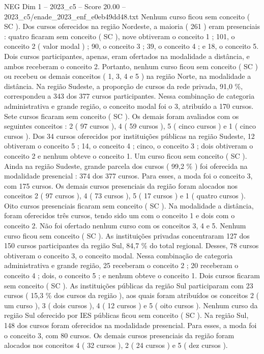 \begin{textsample}{NEG Dim 1 – 2023\_c5 – Score 20.00 – 2023\_c5/enade\_2023\_enf\_e0eb49dd48.txt}
Nenhum curso ficou sem conceito ( SC ).
Dos cursos oferecidos na região Nordeste, a maioria ( 261 ) eram presenciais : quatro ficaram sem conceito ( SC ), nove obtiveram o conceito 1 ; 101, o conceito 2 ( valor modal ) ; 90, o conceito 3 ; 39, o conceito 4 ; e 18, o conceito 5.
Dois cursos participantes, apenas, eram ofertados na modalidade a distância, e ambos receberam o conceito 2.
Portanto, nenhum curso ficou sem conceito ( SC ) ou recebeu os demais conceitos ( 1, 3, 4 e 5 ) na região Norte, na modalidade a distância.
Na região Sudeste, a proporção de cursos da rede privada, 91,0 \%, correspondeu a 343 dos 377 cursos participantes.
Nessa combinação de categoria administrativa e grande região, o conceito modal foi o 3, atribuído a 170 cursos.
Sete cursos ficaram sem conceito ( SC ).
Os demais foram avaliados com os seguintes conceitos : 2 ( 97 cursos ), 4 ( 59 cursos ), 5 ( cinco cursos ) e 1 ( cinco cursos ).
Dos 34 cursos oferecidos por instituições públicas na região Sudeste, 12 obtiveram o conceito 5 ; 14, o conceito 4 ; cinco, o conceito 3 ; dois obtiveram o conceito 2 e nenhum obteve o conceito 1.
Um curso ficou sem conceito ( SC ).
Ainda na região Sudeste, grande parcela dos cursos ( 99,2 \% ) foi oferecida na modalidade presencial : 374 dos 377 cursos.
Para esses, a moda foi o conceito 3, com 175 cursos.
Os demais cursos presenciais da região foram alocados nos conceitos 2 ( 97 cursos ), 4 ( 73 cursos ), 5 ( 17 cursos ) e 1 ( quatro cursos ).
Oito cursos presenciais ficaram sem conceito ( SC ).
Na modalidade a distância, foram oferecidos três cursos, tendo sido um com o conceito 1 e dois com o conceito 2.
Não foi ofertado nenhum curso com os conceitos 3, 4 e 5.
Nenhum curso ficou sem conceito ( SC ).
As instituições privadas concentraram 127 dos 150 cursos participantes da região Sul, 84,7 \% do total regional.
Desses, 78 cursos obtiveram o conceito 3, o conceito modal.
Nessa combinação de categoria administrativa e grande região, 25 receberam o conceito 2 ; 20 receberam o conceito 4 ; dois, o conceito 5 ; e nenhum obteve o conceito 1.
Dois cursos ficaram sem conceito ( SC ).
As instituições públicas da região Sul participaram com 23 cursos ( 15,3 \% dos cursos da região ), aos quais foram atribuídos os conceitos 2 ( um curso ), 3 ( dois cursos ), 4 ( 12 cursos ) e 5 ( oito cursos ).
Nenhum curso da região Sul oferecido por IES públicas ficou sem conceito ( SC ).
Na região Sul, 148 dos cursos foram oferecidos na modalidade presencial.
Para esses, a moda foi o conceito 3, com 80 cursos.
Os demais cursos presenciais da região foram alocados nos conceitos 4 ( 32 cursos ), 2 ( 24 cursos ) e 5 ( dez cursos ).

\end{textsample}
